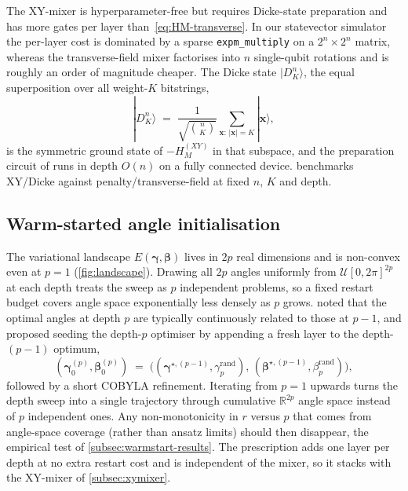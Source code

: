 The XY-mixer is hyperparameter-free but requires Dicke-state preparation and has more gates per layer than~\eqref{eq:HM-transverse}. In our statevector simulator the per-layer cost is dominated by a sparse \texttt{expm\_multiply} on a $2^n\times 2^n$ matrix, whereas the transverse-field mixer factorises into $n$ single-qubit rotations and is roughly an order of magnitude cheaper. The Dicke state $|D^n_K\rangle$, the equal superposition over all weight-$K$ bitstrings,
\begin{equation}\label{eq:dicke}
    |D^n_K\rangle \;=\; \frac{1}{\sqrt{\binom{n}{K}}} \sum_{\boldsymbol{x}:\,|\boldsymbol{x}|=K} |\boldsymbol{x}\rangle,
\end{equation}
is the symmetric ground state of $-H_M^{(XY)}$ in that subspace, and the preparation circuit of \textcite{bartschi2022dicke} runs in depth $O(n)$ on a fully connected device.  benchmarks XY/Dicke against penalty/transverse-field at fixed $n$, $K$ and depth.


\subsection{Warm-started angle initialisation}\label{subsec:warmstart}

The variational landscape $E(\boldsymbol\gamma, \boldsymbol\beta)$ lives in $2p$ real dimensions and is non-convex even at $p=1$ (\cref{fig:landscape}). Drawing all $2p$ angles uniformly from $\mathcal{U}[0,2\pi]^{2p}$ at each depth treats the sweep as $p$ independent problems, so a fixed restart budget covers angle space exponentially less densely as $p$ grows. \textcite{zhou2018qaoa} noted that the optimal angles at depth $p$ are typically continuously related to those at $p-1$, and proposed seeding the depth-$p$ optimiser by appending a fresh layer to the depth-$(p-1)$ optimum,
\begin{equation}\label{eq:warmstart}
    (\boldsymbol\gamma_0^{(p)}, \boldsymbol\beta_0^{(p)})
    \;=\;
    \bigl((\boldsymbol\gamma^{\star,(p-1)}, \gamma_p^{\text{rand}}),\,
          (\boldsymbol\beta^{\star,(p-1)}, \beta_p^{\text{rand}})\bigr),
\end{equation}
followed by a short COBYLA refinement. Iterating from $p=1$ upwards turns the depth sweep into a single trajectory through cumulative $\mathbb{R}^{2p}$ angle space instead of $p$ independent ones. Any non-monotonicity in $r$ versus $p$ that comes from angle-space coverage (rather than ansatz limits) should then disappear, the empirical test of \cref{subsec:warmstart-results}. The prescription adds one layer per depth at no extra restart cost and is independent of the mixer, so it stacks with the XY-mixer of \cref{subsec:xymixer}.


